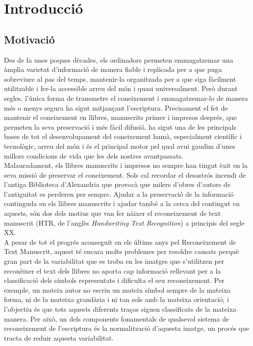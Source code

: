 \chapter{Introducció}
\label{cap:int}

\section{Motivació}
Des de fa unes poques dècades, els ordinadors permeten emmagatzemar una àmplia varietat d'informació de manera fiable i replicada per a que puga sobreviure al pas del temps, mantenir-la organitzada per a que siga fàcilment utilitzable i fer-la accessible arreu del món i quasi universalment. Però durant segles, l'única forma de transmetre el coneixement i emmagatzemar-lo de manera més o menys segura ha sigut mitjançant l'escriptura. Precisament el fet de mantenir el coneixement en llibres, manuscrits primer i impresos després, que permeten la seva preservació i més fàcil difusió, ha sigut una de les principals bases de tot el desenvolupament del coneixement humà, especialment científic i tecnològic, arreu del món i és el principal motor pel qual avui gaudim d'unes millors condicions de vida que les dels nostres avantpassats.\\

Malauradament, els llibres manuscrits i impresos no sempre han tingut èxit en la seva missió de preservar el coneixement. Sols cal recordar el desastrós incendi de l'antiga Biblioteca d'Alexandria que provocà que milers d'obres d'autors de l'antiguitat es perderen per sempre. Ajudar a la preservació de la informació continguda en els llibres manuscrits i ajudar també a la cerca del contingut en aquests, són dos dels motius que van fer nàixer el reconeixement de text manuscrit (HTR, de l'anglès \emph{Handwriting Text Recognition}) a principis del segle XX.\\

A pesar de tot el progrés aconseguit en els últims anys pel Reconeixement de Text Manuscrit, aquest té encara molts problemes per resoldre causats perquè gran part de la variabilitat que es troba en les imatges que s'utilitzen per reconèixer el text dels llibres no aporta cap informació rellevant per a la classificació dels símbols representats i dificulta el seu reconeixement. Per exemple, un mateix autor no escriu un mateix símbol sempre de la mateixa forma, ni de la mateixa grandària i ni tan sols amb la mateixa orientació; i l'objectiu és que tots aquests diferents traços siguen classificats de la mateixa manera. Per això, un dels components fonamentals de qualsevol sistema de reconeixement de l'escriptura és la normalització d'aquesta imatge, un procés que tracta de reduir aquesta variabilitat.\\

